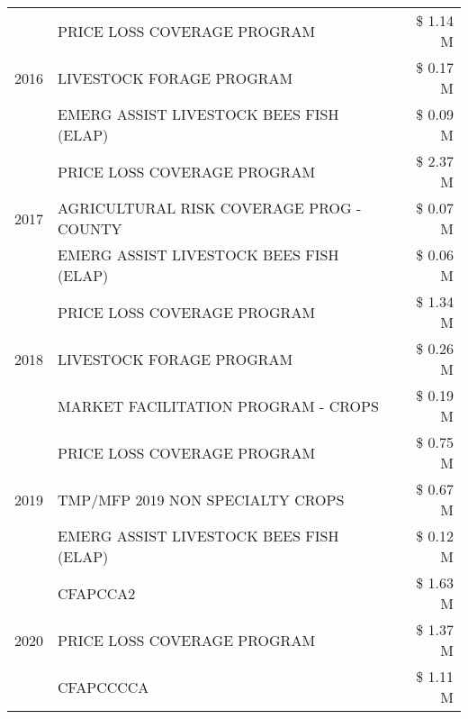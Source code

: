 \begin{tabular}{llr}
\cline{1-3}
\multirow[t]{3}{*}{2016} & PRICE LOSS COVERAGE PROGRAM & \$ 1.14 M \\
 & LIVESTOCK FORAGE PROGRAM & \$ 0.17 M \\
 & EMERG ASSIST LIVESTOCK BEES FISH (ELAP) & \$ 0.09 M \\
\cline{1-3}
\multirow[t]{3}{*}{2017} & PRICE LOSS COVERAGE PROGRAM & \$ 2.37 M \\
 & AGRICULTURAL RISK COVERAGE PROG - COUNTY & \$ 0.07 M \\
 & EMERG ASSIST LIVESTOCK BEES FISH (ELAP) & \$ 0.06 M \\
\cline{1-3}
\multirow[t]{3}{*}{2018} & PRICE LOSS COVERAGE PROGRAM & \$ 1.34 M \\
 & LIVESTOCK FORAGE PROGRAM & \$ 0.26 M \\
 & MARKET FACILITATION PROGRAM - CROPS & \$ 0.19 M \\
\cline{1-3}
\multirow[t]{3}{*}{2019} & PRICE LOSS COVERAGE PROGRAM & \$ 0.75 M \\
 & TMP/MFP 2019 NON SPECIALTY CROPS & \$ 0.67 M \\
 & EMERG ASSIST LIVESTOCK BEES FISH (ELAP) & \$ 0.12 M \\
\cline{1-3}
\multirow[t]{3}{*}{2020} & CFAPCCA2 & \$ 1.63 M \\
 & PRICE LOSS COVERAGE PROGRAM & \$ 1.37 M \\
 & CFAPCCCCA & \$ 1.11 M \\
\cline{1-3}
\bottomrule
\end{tabular}
